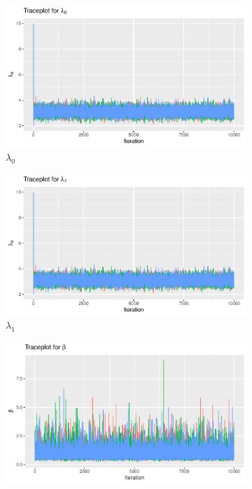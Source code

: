 \begin{figure}[H]
    \centering
    \begin{subfigure}[b]{0.49\textwidth}
        \centering
        \includegraphics[width = \textwidth]{Images/mixing_lambda_0.pdf}
        \caption{$\lambda_0$ }
    \end{subfigure}
    \begin{subfigure}[b]{0.49\textwidth}
        \centering
        \includegraphics[width = \textwidth]{Images/mixing_lambda_1.pdf}
        \caption{$\lambda_1$}
    \end{subfigure}
    \begin{subfigure}[b]{0.49\textwidth}
        \centering
        \includegraphics[width = \textwidth]{Images/mixing_beta.pdf}

\end{subfigure}
\end{figure}
